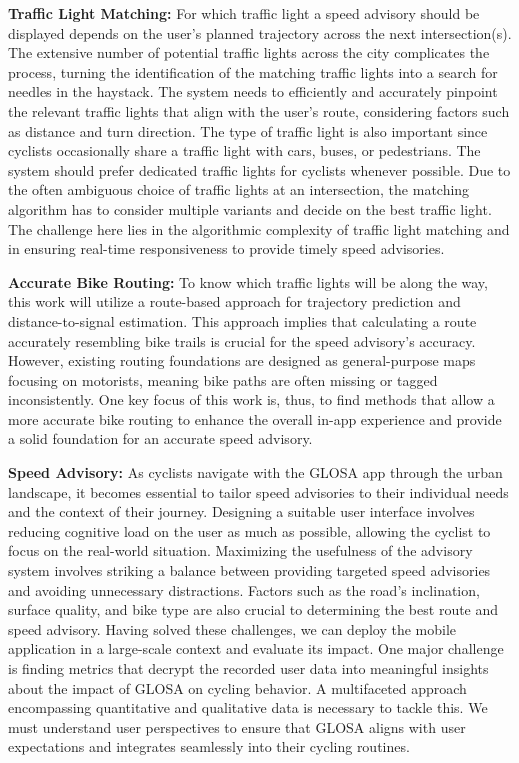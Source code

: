 \textbf{\color{cidarkblue}Traffic Light Matching:} For which traffic light a speed advisory should be displayed depends on the user's planned trajectory across the next intersection(s). The extensive number of potential traffic lights across the city complicates the process, turning the identification of the matching traffic lights into a search for needles in the haystack. The system needs to efficiently and accurately pinpoint the relevant traffic lights that align with the user's route, considering factors such as distance and turn direction. The type of traffic light is also important since cyclists occasionally share a traffic light with cars, buses, or pedestrians. The system should prefer dedicated traffic lights for cyclists whenever possible. Due to the often ambiguous choice of traffic lights at an intersection, the matching algorithm has to consider multiple variants and decide on the best traffic light. The challenge here lies in the algorithmic complexity of traffic light matching and in ensuring real-time responsiveness to provide timely speed advisories.

\textbf{\color{cidarkblue}Accurate Bike Routing:} To know which traffic lights will be along the way, this work will utilize a route-based approach for trajectory prediction and distance-to-signal estimation. This approach implies that calculating a route accurately resembling bike trails is crucial for the speed advisory's accuracy. However, existing routing foundations are designed as general-purpose maps focusing on motorists, meaning bike paths are often missing or tagged inconsistently. One key focus of this work is, thus, to find methods that allow a more accurate bike routing to enhance the overall in-app experience and provide a solid foundation for an accurate speed advisory.

\textbf{\color{cidarkblue}Speed Advisory:} As cyclists navigate with the GLOSA app through the urban landscape, it becomes essential to tailor speed advisories to their individual needs and the context of their journey. Designing a suitable user interface involves reducing cognitive load on the user as much as possible, allowing the cyclist to focus on the real-world situation. Maximizing the usefulness of the advisory system involves striking a balance between providing targeted speed advisories and avoiding unnecessary distractions. Factors such as the road's inclination, surface quality, and bike type are also crucial to determining the best route and speed advisory. Having solved these challenges, we can deploy the mobile application in a large-scale context and evaluate its impact. One major challenge is finding metrics that decrypt the recorded user data into meaningful insights about the impact of GLOSA on cycling behavior. A multifaceted approach encompassing quantitative and qualitative data is necessary to tackle this. We must understand user perspectives to ensure that GLOSA aligns with user expectations and integrates seamlessly into their cycling routines. 

